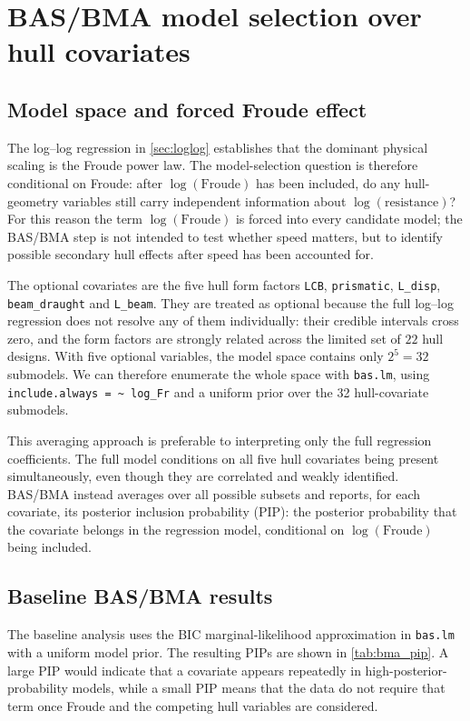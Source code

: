 \documentclass[12pt,a4paper]{article}
\begin{document}
\section{BAS/BMA model selection over hull covariates}
\label{sec:bma}

\subsection{Model space and forced Froude effect}

The log--log regression in \cref{sec:loglog} establishes that the dominant
physical scaling is the Froude power law. The model-selection question is
therefore conditional on Froude: after $\log(\mathrm{Froude})$ has been
included, do any hull-geometry variables still carry independent information
about $\log(\mathrm{resistance})$? For this reason the term
$\log(\mathrm{Froude})$ is forced into every candidate model; the BAS/BMA step is
not intended to test whether speed matters, but to identify possible secondary
hull effects after speed has been accounted for.

The optional covariates are the five hull form factors \texttt{LCB},
\texttt{prismatic}, \texttt{L\_disp}, \texttt{beam\_draught} and
\texttt{L\_beam}. They are treated as optional because the full log--log
regression does not resolve any of them individually: their credible intervals
cross zero, and the form factors are strongly related across the limited set of
$22$ hull designs. With five optional variables, the model space contains only
$2^5=32$ submodels. We can therefore enumerate the whole space with
\texttt{bas.lm}, using \texttt{include.always = \textasciitilde{} log\_Fr} and a
uniform prior over the 32 hull-covariate submodels.

This averaging approach is preferable to interpreting only the full regression
coefficients. The full model conditions on all five hull covariates being
present simultaneously, even though they are correlated and weakly identified.
BAS/BMA instead averages over all possible subsets and reports, for each
covariate, its posterior inclusion probability (PIP): the posterior probability
that the covariate belongs in the regression model, conditional on
$\log(\mathrm{Froude})$ being included.

\subsection{Baseline BAS/BMA results}

The baseline analysis uses the BIC marginal-likelihood approximation in
\texttt{bas.lm} with a uniform model prior. The resulting PIPs are shown in
\cref{tab:bma_pip}. A large PIP would indicate that a covariate appears
repeatedly in high-posterior-probability models, while a small PIP means that
the data do not require that term once Froude and the competing hull variables
are considered.
\end{document}
